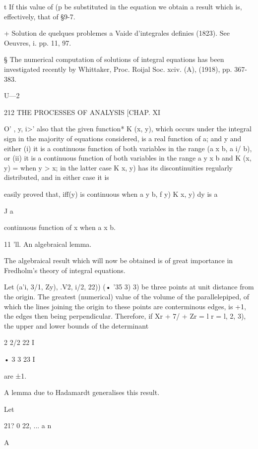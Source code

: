 t If this value of (p be substituted in the equation we obtain a result which is, effectively, that 
of §9-7. 

+ Solution de quelques problemes a Vaide d'integrales definies (1823). See Oeuvres, i. pp. 11, 97. 

§ The numerical computation of solutions of integral equations has been investigated recently 
by Whittaker, Proc. Roijal Soc. xciv. (A), (1918), pp. 367-383. 

U—2 



212 THE PROCESSES OF ANALYSIS [CHAP. XI 

O' , y,  i>'  also that the given function* K (x, y), which occurs under the 
integral sign in the majority of equations considered, is a real function of 
a; and y and either (i) it is a continuous function of both variables in the 
range (a  x b, a i/  b), or (ii) it is a continuous function of both variables 
in the range a y  x b and K (x, y) = when y > x; in the latter case 
K x, y) has its discontinuities regularly distributed, and in either case it is 

easily proved that, iff(y) is continuous when a y b, f y) K x, y) dy is a 

J a 

continuous function of x when a x b. 

11 'll. An algebraical lemma. 

The algebraical result which will now be obtained is of great importance in Fredholm's 
theory of integral equations. 

Let (a'i, 3/1, Zy),  .V2, i/2, 22)) (• '35  3)   3) be three points at unit distance from the origin. 
The greatest (numerical) value of the volume of the parallelepiped, of which the lines 
joining the origin to these points are conterminous edges, is +1, the edges then being 
perpendicular. Therefore, if Xr  + 7/  + Zr  = l  r = l, 2, 3), the upper and lower bounds of 
the determinant 

 2 2/2 22 I 

•  3  3 23 I 

are ±1. 

A lemma due to Hadamardt generalises this result. 



Let 



 21? 0 22, ... a n 



A 



